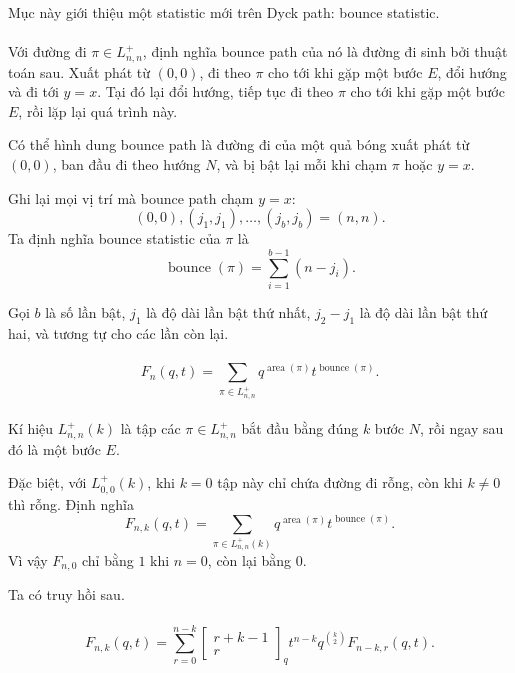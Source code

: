 \documentclass[11pt]{article}
\begin{document}
Mục này giới thiệu một statistic mới trên Dyck path: bounce statistic.

\paragraph{}
Với đường đi \(\pi\in L^+_{n,n}\), định nghĩa bounce path của nó là đường đi
sinh bởi thuật toán sau. Xuất phát từ \((0,0)\), đi theo \(\pi\) cho tới khi
gặp một bước \(E\), đổi hướng và đi tới \(y=x\). Tại đó lại đổi hướng, tiếp
tục đi theo \(\pi\) cho tới khi gặp một bước \(E\), rồi lặp lại quá trình này.

Có thể hình dung bounce path là đường đi của một quả bóng xuất phát từ
\((0,0)\), ban đầu đi theo hướng \(N\), và bị bật lại mỗi khi chạm \(\pi\) hoặc
\(y=x\).

Ghi lại mọi vị trí mà bounce path chạm \(y=x\):
\[
  (0,0),(j_1,j_1),\ldots,(j_b,j_b)=(n,n).
\]
Ta định nghĩa bounce statistic của \(\pi\) là
\[
  \operatorname{bounce}(\pi)=\sum_{i=1}^{b-1}(n-j_i).
\]


Gọi \(b\) là số lần bật, \(j_1\) là độ dài lần bật thứ nhất,
\(j_2-j_1\) là độ dài lần bật thứ hai, và tương tự cho các lần còn lại.

\paragraph{}
\[
  F_n(q,t)=\sum_{\pi\in L^+_{n,n}}
  q^{\operatorname{area}(\pi)}t^{\operatorname{bounce}(\pi)}.
\]

\paragraph{}
Kí hiệu \(L^+_{n,n}(k)\) là tập các \(\pi\in L^+_{n,n}\) bắt đầu bằng đúng
\(k\) bước \(N\), rồi ngay sau đó là một bước \(E\).

Đặc biệt, với \(L^+_{0,0}(k)\), khi \(k=0\) tập này chỉ chứa đường đi rỗng,
còn khi \(k\ne0\) thì rỗng. Định nghĩa
\[
  F_{n,k}(q,t)=\sum_{\pi\in L^+_{n,n}(k)}
  q^{\operatorname{area}(\pi)}t^{\operatorname{bounce}(\pi)}.
\]
Vì vậy \(F_{n,0}\) chỉ bằng \(1\) khi \(n=0\), còn lại bằng \(0\).

Ta có truy hồi sau.

\paragraph{}
\[
  F_{n,k}(q,t)=
  \sum_{r=0}^{n-k}
  \left[\begin{matrix}r+k-1\\ r\end{matrix}\right]_q
  t^{n-k}q^{\binom{k}{2}}F_{n-k,r}(q,t).
\]
\end{document}
